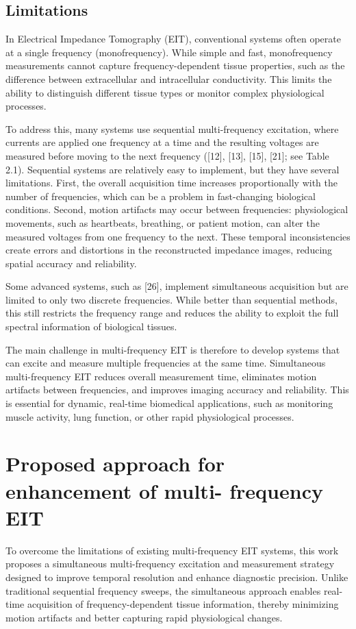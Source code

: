 \subsection{Limitations }
In Electrical Impedance Tomography (EIT), conventional systems often operate at a single frequency (monofrequency). While simple and fast, monofrequency measurements cannot capture frequency-dependent tissue properties, such as the difference between extracellular and intracellular conductivity. This limits the ability to distinguish different tissue types or monitor complex physiological processes.

To address this, many systems use sequential multi-frequency excitation, where currents are applied one frequency at a time and the resulting voltages are measured before moving to the next frequency ([12], [13], [15], [21]; see Table 2.1). Sequential systems are relatively easy to implement, but they have several limitations. First, the overall acquisition time increases proportionally with the number of frequencies, which can be a problem in fast-changing biological conditions. Second, motion artifacts may occur between frequencies: physiological movements, such as heartbeats, breathing, or patient motion, can alter the measured voltages from one frequency to the next. These temporal inconsistencies create errors and distortions in the reconstructed impedance images, reducing spatial accuracy and reliability.

Some advanced systems, such as [26], implement simultaneous acquisition but are limited to only two discrete frequencies. While better than sequential methods, this still restricts the frequency range and reduces the ability to exploit the full spectral information of biological tissues.

The main challenge in multi-frequency EIT is therefore to develop systems that can excite and measure multiple frequencies at the same time. Simultaneous multi-frequency EIT reduces overall measurement time, eliminates motion artifacts between frequencies, and improves imaging accuracy and reliability. This is essential for dynamic, real-time biomedical applications, such as monitoring muscle activity, lung function, or other rapid physiological processes.

\section{Proposed approach for enhancement of multi- frequency EIT}

To overcome the limitations of existing multi-frequency EIT systems, this work proposes a simultaneous multi-frequency excitation and measurement strategy designed to improve temporal resolution and enhance diagnostic precision. Unlike traditional sequential frequency sweeps, the simultaneous approach enables real-time acquisition of frequency-dependent tissue information, thereby minimizing motion artifacts and better capturing rapid physiological changes.  

